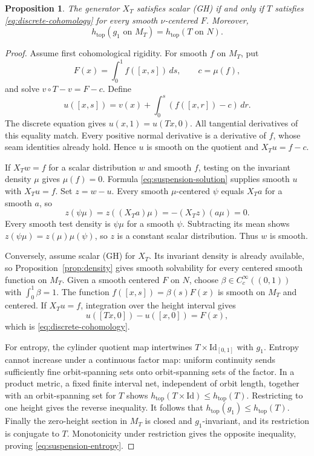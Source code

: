 \documentclass[11pt]{article}
\newtheorem{proposition}[theorem]{Proposition}
\theoremstyle{definition}
\theoremstyle{remark}
\newcommand{\htop}{h_{\mathrm{top}}}
\begin{document}
\begin{proposition}\label{prop:suspension}
The generator $X_T$ satisfies scalar (GH) if and only if $T$ satisfies \eqref{eq:discrete-cohomology} for every smooth $\nu$-centered $F$. Moreover,
\begin{equation}\label{eq:suspension-entropy}
 \htop(g_1\text{ on }M_T)=\htop(T\text{ on }N).
\end{equation}
\end{proposition}
\begin{proof}
Assume first cohomological rigidity. For smooth $f$ on $M_T$, put
\[
 F(x)=\int_0^1 f([x,s])\,ds,\qquad c=\mu(f),
\]
and solve $v\circ T-v=F-c$. Define
\begin{equation}\label{eq:suspension-solution}
 u([x,s])=v(x)+\int_0^s(f([x,r])-c)\,dr.
\end{equation}
The discrete equation gives $u(x,1)=u(Tx,0)$. All tangential derivatives of this equality match. Every positive normal derivative is a derivative of $f$, whose seam identities already hold. Hence $u$ is smooth on the quotient and $X_Tu=f-c$.

If $X_Tw=f$ for a scalar distribution $w$ and smooth $f$, testing on the invariant density $\mu$ gives $\mu(f)=0$. Formula \eqref{eq:suspension-solution} supplies smooth $u$ with $X_Tu=f$. Set $z=w-u$. Every smooth $\mu$-centered $\psi$ equals $X_Ta$ for a smooth $a$, so
\[
 z(\psi\mu)=z((X_Ta)\mu)=-(X_Tz)(a\mu)=0.
\]
Every smooth test density is $\psi\mu$ for a smooth $\psi$. Subtracting its mean shows $z(\psi\mu)=z(\mu)\mu(\psi)$, so $z$ is a constant scalar distribution. Thus $w$ is smooth.

Conversely, assume scalar (GH) for $X_T$. Its invariant density is already available, so Proposition~\ref{prop:density} gives smooth solvability for every centered smooth function on $M_T$. Given a smooth centered $F$ on $N$, choose $\beta\in C_c^\infty((0,1))$ with $\int_0^1\beta=1$. The function $f([x,s])=\beta(s)F(x)$ is smooth on $M_T$ and centered. If $X_Tu=f$, integration over the height interval gives
\[
 u([Tx,0])-u([x,0])=F(x),
\]
which is \eqref{eq:discrete-cohomology}.

For entropy, the cylinder quotient map intertwines $T\times\mathrm{Id}_{[0,1]}$ with $g_1$. Entropy cannot increase under a continuous factor map: uniform continuity sends sufficiently fine orbit-spanning sets onto orbit-spanning sets of the factor. In a product metric, a fixed finite interval net, independent of orbit length, together with an orbit-spanning set for $T$ shows
$\htop(T\times\mathrm{Id})\le\htop(T)$. Restricting to one height gives the reverse inequality. It follows that $\htop(g_1)\le\htop(T)$. Finally the zero-height section in $M_T$ is closed and $g_1$-invariant, and its restriction is conjugate to $T$. Monotonicity under restriction gives the opposite inequality, proving \eqref{eq:suspension-entropy}.
\end{proof}
\end{document}
